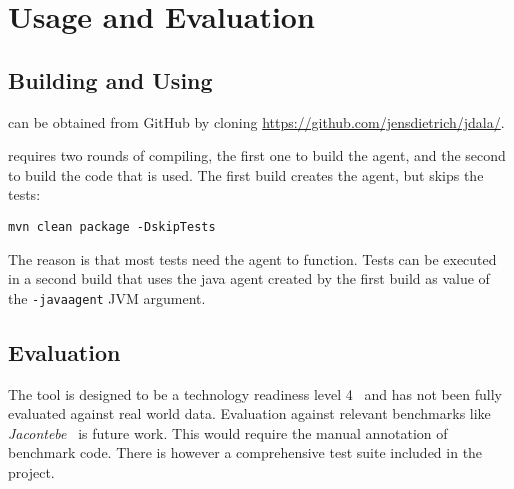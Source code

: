 \section{Usage and Evaluation}
\label{sec:useandevaluate}	


\subsection{Building and Using \jdala}

\jdala can be obtained from GitHub by cloning \url{https://github.com/jensdietrich/jdala/}.


\jdala requires two rounds of compiling, the first one to build the agent, and the second to build the code that is used. The first build creates the agent, but skips the tests:

\texttt{mvn clean package -DskipTests}

The reason is that most tests need the agent to function. Tests can be executed in a second build that uses the java agent created by the first build as value of the \texttt{-javaagent} JVM argument.

\subsection{Evaluation}


The tool is designed to be a technology readiness level 4~\cite{mankins1995technology} and has not been fully evaluated against real world data. Evaluation against relevant  benchmarks like \textit{Jacontebe}~\cite{lin2015jacontebe} is future work. This would require the manual annotation of benchmark code. There is however a comprehensive test suite included in the project.  

